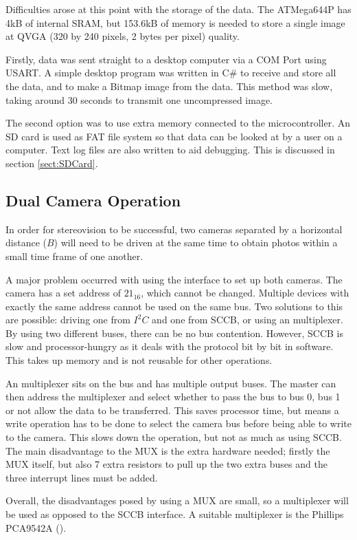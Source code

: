 Difficulties arose at this point with the storage of the data. The ATMega644P has 4kB of internal SRAM, but  153.6kB of memory is needed to store a single image at QVGA (320 by 240 pixels, 2 bytes per pixel) quality. 

Firstly, data was sent straight to a desktop computer via a COM Port using USART. A simple desktop program was written in C\# to receive and store all the data, and to make a Bitmap image from the data. This method was slow, taking around 30 seconds to transmit one uncompressed image. 

The second option was to use extra memory connected to the microcontroller. An SD card is used as FAT file system so that data can be looked at by a user on a computer. Text log files are also written to aid debugging. This is discussed in section \ref{sect:SDCard}. 

\subsection{Dual Camera Operation}
In order for stereovision to be successful, two cameras separated by a horizontal distance ($B$) will need to be driven at the same time to obtain photos within a small time frame of one another.

A major problem occurred with using the \itc interface to set up both cameras. The camera has a set \itc address of $21_{16}$, which cannot be changed. Multiple \itc devices with exactly the same address cannot be used on the same bus. 
Two solutions to this are possible: driving one from $I^{2}C$ and one from SCCB, or using an \itc multiplexer. By using two different buses, there can be no bus contention. However, SCCB is slow and processor-hungry as it deals with the protocol bit by bit in software. This takes up memory and is not reusable for other operations.

An \itc multiplexer sits on the bus and has multiple output buses. The master can then address the multiplexer and select whether to pass the bus to bus 0, bus 1 or not allow the data to be transferred. This saves processor time, but means a write operation has to be done to select the camera bus before being able to write to the camera. This slows down the operation, but not as much as using SCCB. The main disadvantage to the \itc MUX is the extra hardware needed; firstly the MUX itself, but also 7 extra resistors to pull up the two extra buses and the three interrupt lines must be added. 

Overall, the disadvantages posed by using a MUX are small, so a multiplexer will be used as opposed to the SCCB interface. A suitable multiplexer is the Phillips PCA9542A (\cite{I2C_Mux}).

